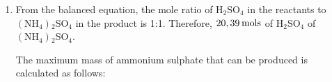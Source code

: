 {\begin{mdframed}[linewidth=4, leftmargin=40, rightmargin=40]
\begin{exercise}
\begin{enumerate}[noitemsep, label=\textbf{Step} \textbf{\arabic*}. ]
      \item  
      \label{m38712*id285156}From the balanced equation, the mole ratio of \begin{math}\mathrm{H}{}_{2}\mathrm{SO}{}_{4}\end{math} in the reactants to \begin{math}\left(\mathrm{NH}{}_{4}\right){}_{2}\mathrm{SO}{}_{4}\end{math} in the product is 1:1. Therefore, \begin{math}20,39\phantom{\rule{2pt}{0ex}}\mathrm{mols}\end{math} of \begin{math}\mathrm{H}{}_{2}\mathrm{SO}{}_{4}\end{math} of \begin{math}\left(\mathrm{NH}{}_{4}\right){}_{2}\mathrm{SO}{}_{4}\end{math}.\par 
      \label{m38712*id285290}The maximum mass of ammonium sulphate that can be produced is calculated as follows:
      \label{m38712*id285296}\nopagebreak\noindent{}
    

\end{enumerate}
\end{exercise}
\end{mdframed}}
